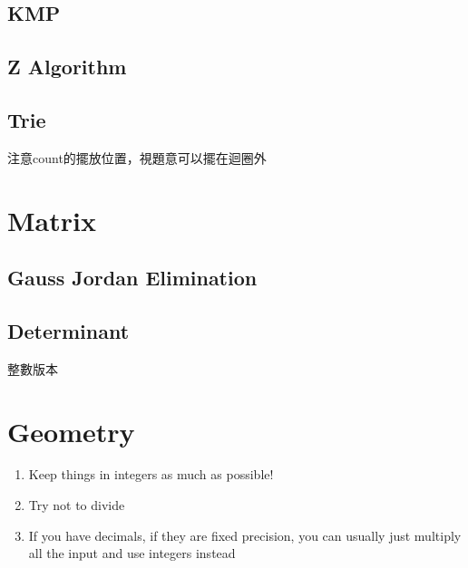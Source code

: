 \documentclass[10pt,oneside]{article}
\begin{document}
\begin{landscape}
\begin{multicols}{2}
				
				\subsection{KMP}
				
				
				\subsection{Z Algorithm}
				
				
				\subsection{Trie}
				{\normalsize 
					注意count的擺放位置，視題意可以擺在迴圈外
				}
				
				\section{Matrix}
				
				\subsection{Gauss Jordan Elimination}
				
				\subsection{Determinant}
				
				{\normalsize 
					整數版本
				}
				
				
				
				\section{Geometry}
				
				{\normalsize 
					\begin{enumerate}
						\item Keep things in integers as much as possible!
						\item Try not to divide
						\item If you have decimals, if they are fixed precision, you can usually just multiply all the input and use integers instead
					\end{enumerate}
				}
				

\end{multicols}
\end{landscape}
\end{document}
